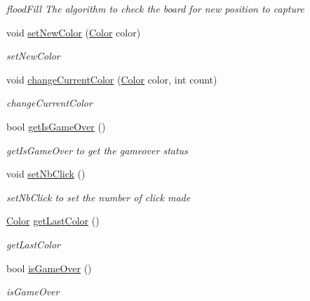 \begin{DoxyCompactItemize}
\begin{DoxyCompactList}\small\item\em flood\+Fill The algorithm to check the board for new position to capture \end{DoxyCompactList}\item 
void \hyperlink{classoli_1_1_floodgame_a371ea67d0f296c8cd3ba07e1d31cb7fe}{set\+New\+Color} (\hyperlink{namespaceoli_aac44697e43b3ab2ad32fe892ab2276eb}{Color} color)
\begin{DoxyCompactList}\small\item\em set\+New\+Color \end{DoxyCompactList}\item 
void \hyperlink{classoli_1_1_floodgame_aa6be75fd33a3181117c80529561c1f0c}{change\+Current\+Color} (\hyperlink{namespaceoli_aac44697e43b3ab2ad32fe892ab2276eb}{Color} color, int count)
\begin{DoxyCompactList}\small\item\em change\+Current\+Color \end{DoxyCompactList}\item 
bool \hyperlink{classoli_1_1_floodgame_a839915256ec11211fdbf95195c8e51cb}{get\+Is\+Game\+Over} ()
\begin{DoxyCompactList}\small\item\em get\+Is\+Game\+Over to get the gameover status \end{DoxyCompactList}\item 
void \hyperlink{classoli_1_1_floodgame_ad30fd6f491f98397de7eb46fcc96c875}{set\+Nb\+Click} ()
\begin{DoxyCompactList}\small\item\em set\+Nb\+Click to set the number of click made \end{DoxyCompactList}\item 
\hyperlink{namespaceoli_aac44697e43b3ab2ad32fe892ab2276eb}{Color} \hyperlink{classoli_1_1_floodgame_ab302cc4ae3712da0de83520cb86d9567}{get\+Last\+Color} ()
\begin{DoxyCompactList}\small\item\em get\+Last\+Color \end{DoxyCompactList}\item 
bool \hyperlink{classoli_1_1_floodgame_adfcb41900bae06b64a8d4d77164b67d5}{is\+Game\+Over} ()
\begin{DoxyCompactList}\small\item\em is\+Game\+Over \end{DoxyCompactList}\item 

\end{DoxyCompactItemize}
